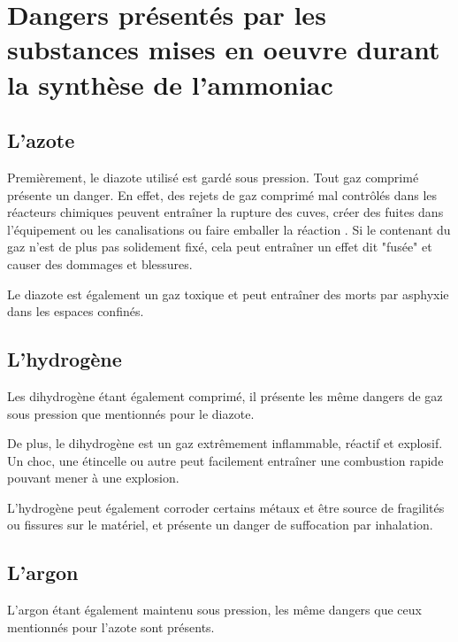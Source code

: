 

\section{Dangers présentés par les substances mises en oeuvre durant la synthèse de l'ammoniac}
\subsection{L'azote}
Premièrement, le diazote utilisé est gardé sous pression. Tout gaz comprimé présente un danger. 
En effet, des rejets de gaz comprimé mal contrôlés dans les réacteurs chimiques peuvent entraîner 
la rupture des cuves, créer des fuites dans l'équipement ou les canalisations ou faire emballer la réaction \cite{canada}.
Si le contenant du gaz n'est de plus pas solidement fixé, cela peut entraîner un effet dit "fusée" 
et causer des dommages et blessures.

Le diazote est également un gaz toxique et peut entraîner des morts par asphyxie dans les espaces confinés. 

\subsection{L'hydrogène}
Les dihydrogène étant également comprimé, il présente les même dangers de gaz sous 
pression que mentionnés pour le diazote.

De plus, le dihydrogène est un gaz extrêmement inflammable, réactif et explosif. 
Un choc, une étincelle ou autre peut facilement 
entraîner une combustion rapide pouvant mener à une explosion.

L'hydrogène peut également corroder certains métaux et être source de fragilités
ou fissures sur le matériel, et présente un danger de suffocation par inhalation.

\subsection{L'argon}
L'argon étant également maintenu sous pression, les même dangers que ceux mentionnés
pour l'azote sont présents.

